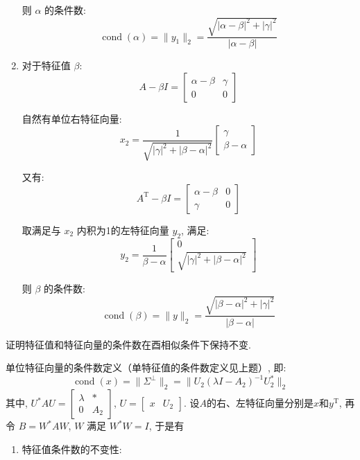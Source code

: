 \documentclass[12pt, answers]{exam}     %
\newcommand{\T}{\mathrm{T}}
\begin{document}
\begin{questions}
\begin{solution}
\begin{enumerate}
    则 $ \alpha $ 的条件数:
    \[
    \operatorname{cond}(\alpha) = \|y_1\|_{2} = \dfrac{\sqrt{|\alpha - \beta|^2 + |\gamma|^2}}{|\alpha - \beta|}
    \]
    
    \item 对于特征值 \(\beta\): 
    \[
    A - \beta I = \begin{bmatrix} 
    \alpha - \beta & \gamma \\ 
    0 & 0 
    \end{bmatrix}
    \]
    
    自然有单位右特征向量:
    \[
    x_2 = \frac{1}{\sqrt{|\gamma|^2 + |\beta - \alpha|^2}} \begin{bmatrix} \gamma \\ \beta - \alpha \end{bmatrix}
    \]
    
    又有:
    \[
    A^{\T} - {\beta} I = \begin{bmatrix} 
    {\alpha} - {\beta} & 0 \\ 
    {\gamma} & 0 
    \end{bmatrix}
    \]
    
    取满足与 $ x_2 $ 内积为1的左特征向量 \( y_2 \), 满足:
    \[ 
    y_2 = \dfrac{1}{\beta - \alpha} \begin{bmatrix} 0 \\ \sqrt{|\gamma|^2 + |\beta - \alpha|^2} \end{bmatrix}
    \]
    
    则 $ \beta $ 的条件数:
    \[
    \operatorname{cond}(\beta) = \| y \|_2 = \frac{\sqrt{|\beta - \alpha|^2 + |\gamma|^2}}{|\beta - \alpha|}
    \]

\end{enumerate}

\end{solution}


\question{}证明特征值和特征向量的条件数在酉相似条件下保持不变. 

\begin{solution}
单位特征向量的条件数定义（单特征值的条件数定义见上题）, 即:
\[
\operatorname{cond}(x) = \| \Sigma^{\perp} \|_2 = \| U_2 ( \lambda I - A_2 )^{-1} U_2^* \|_2
\]
其中, $U^* A U = \begin{bmatrix} \lambda & * \\ 0 & A_2 \end{bmatrix} $, $ U = \begin{bmatrix} x & U_2 \end{bmatrix} $. 
设$ A $的右、左特征向量分别是$ x $和$ y^{\T}$, 再令 $ B = W^* A W $, $ W $ 满足 $ W^*W = I $, 于是有
\begin{enumerate}
    \item 特征值条件数的不变性:
    

\end{enumerate}
\end{solution}
\end{questions}
\end{document}
